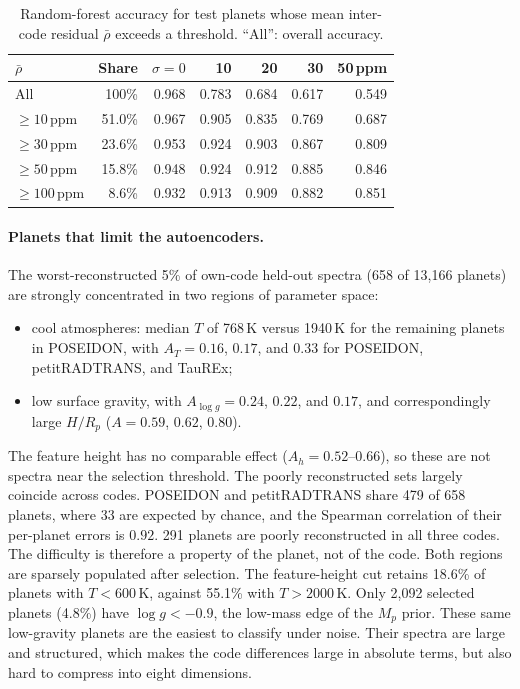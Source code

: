 \begin{table}[t]
  \centering
  \caption{Random-forest accuracy for test planets whose mean inter-code residual $\bar\rho$ exceeds a threshold. ``All'': overall accuracy.}
  \label{tab:rfrho}
  \begin{tabular}{lrrrrrr}
    \toprule
    $\bar\rho$ & Share & $\sigma=0$ & 10 & 20 & 30 & 50\,ppm \\
    \midrule
    All               & 100\%  & 0.968 & 0.783 & 0.684 & 0.617 & 0.549 \\
    $\geq10$\,ppm     & 51.0\% & 0.967 & 0.905 & 0.835 & 0.769 & 0.687 \\
    $\geq30$\,ppm     & 23.6\% & 0.953 & 0.924 & 0.903 & 0.867 & 0.809 \\
    $\geq50$\,ppm     & 15.8\% & 0.948 & 0.924 & 0.912 & 0.885 & 0.846 \\
    $\geq100$\,ppm    & 8.6\%  & 0.932 & 0.913 & 0.909 & 0.882 & 0.851 \\
    \bottomrule
  \end{tabular}
\end{table}

\paragraph{Planets that limit the autoencoders.}
The worst-reconstructed 5\% of own-code held-out spectra (658 of 13{,}166 planets) are strongly concentrated in two regions of parameter space:
\begin{itemize}
  \item cool atmospheres: median $T$ of 768\,K versus 1940\,K for the remaining planets in POSEIDON, with $A_T=0.16$, $0.17$, and $0.33$ for POSEIDON, petitRADTRANS, and TauREx;
  \item low surface gravity, with $A_{\log g}=0.24$, $0.22$, and $0.17$, and correspondingly large $H/R_p$ ($A=0.59$, $0.62$, $0.80$).
\end{itemize}
The feature height has no comparable effect ($A_h=0.52$--$0.66$), so these are not spectra near the selection threshold.
The poorly reconstructed sets largely coincide across codes.
POSEIDON and petitRADTRANS share 479 of 658 planets, where 33 are expected by chance, and the Spearman correlation of their per-planet errors is $0.92$.
291 planets are poorly reconstructed in all three codes.
The difficulty is therefore a property of the planet, not of the code.
Both regions are sparsely populated after selection.
The feature-height cut retains 18.6\% of planets with $T<600$\,K, against 55.1\% with $T>2000$\,K.
Only 2{,}092 selected planets (4.8\%) have $\log g<-0.9$, the low-mass edge of the $M_p$ prior.
These same low-gravity planets are the easiest to classify under noise.
Their spectra are large and structured, which makes the code differences large in absolute terms, but also hard to compress into eight dimensions.

